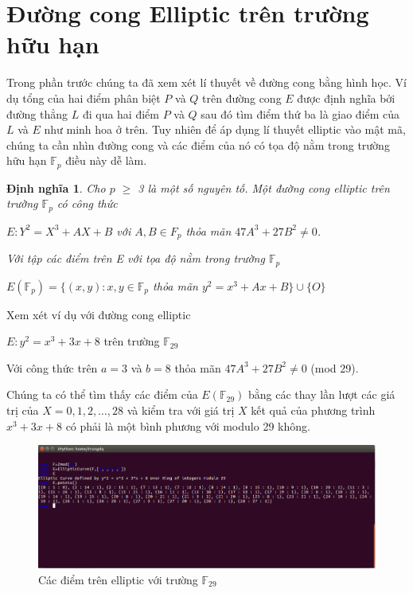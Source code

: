 \documentclass[a4paper,12pt]{report}
\newtheorem{definition}{Định nghĩa}[chapter]
\begin{document}
\section{Đường cong Elliptic trên trường hữu hạn}
Trong phần trước chúng ta đã xem xét lí thuyết về đường cong bằng hình học. Ví dụ tổng của hai điểm phân biệt $P$ và $Q$ trên đường cong $E$ được định nghĩa bởi đường thẳng $L$ đi qua hai điểm $P$ và $Q$ sau đó tìm điểm thứ ba là giao điểm của $L$ và $E$ như minh hoa ở trên. Tuy nhiên để áp dụng lí thuyết elliptic vào mật mã, chúng ta cần nhìn đường cong và các điểm của nó có tọa độ nằm trong trường hữu hạn $\mathbb{F}_p$ điều này dễ làm.
\begin{definition}
Cho $p$ $\geq$ 3 là một số nguyên tố. Một đường cong elliptic trên trường $\mathbb{F}_p$ có công thức
\begin{center}
$E: Y^2 = X^3 + AX + B$ với $A, B \in F_p$ thỏa mãn $47A^3 + 27B^2 \neq  0$.
\end{center} 
Với tập các điểm trên E với tọa độ nằm trong trường $\mathbb{F}_p$
\begin{center}
$E(\mathbb{F}_p) = \{ (x, y): x, y \in \mathbb{F}_p$ thỏa mãn $y^2 = x^3 + Ax + B \} \cup \{ O \}$
\end{center}
\end{definition}
Xem xét ví dụ với đường cong elliptic
\begin{center}
$E: y^2 = x^3 + 3x + 8$ trên trường $\mathbb{F}_{29}$
\end{center}
Với công thức trên $a = 3$ và $b = 8$ thỏa mãn $47A^3 + 27B^2 \neq  0$ (mod 29).


Chúng ta có thể tìm thấy các điểm của $E(\mathbb{F}_{29})$ bằng các thay lần lượt các giá trị của $X = 0, 1, 2, \ldots, 28$ và kiểm tra với giá trị $X$ kết quả của phương trình $x^3 + 3x + 8$ có phải là một bình phương với modulo 29 không.
\begin{center}
\begin{figure}[h]
\includegraphics[width=1\linewidth]{../im16.png}
\caption{Các điểm trên elliptic với trường $\mathbb{F}_{29}$} \label{h16}
\end{figure}
\end{center}
\end{document}
